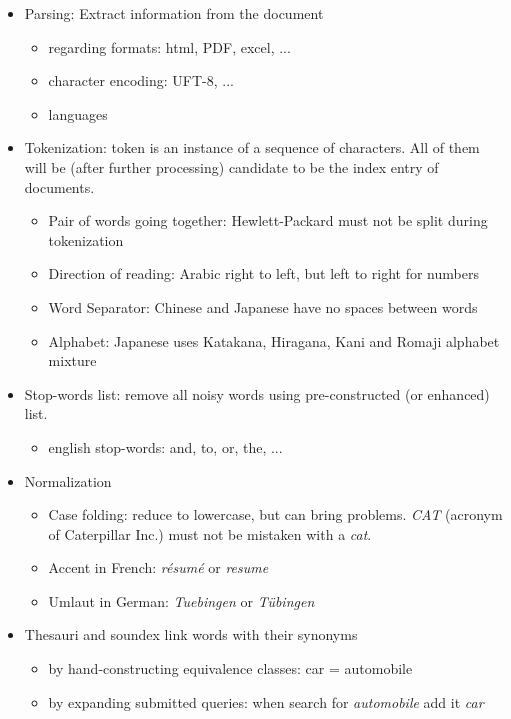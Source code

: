\begin{itemize}
	\item Parsing: Extract information from the document
	\begin{itemize}
		\item regarding formats: html, PDF, excel, ... 
		\item character encoding: UFT-8, ...
		\item languages
	\end{itemize}
	
	\item Tokenization: token is an instance of a sequence of characters. All of them will be (after further processing) candidate to be the index entry of documents.
	\begin{itemize}
		\item Pair of words going together: Hewlett-Packard must not be split during tokenization
		\item Direction of reading: Arabic right to left, but left to right for numbers
		\item Word Separator: Chinese and Japanese have no spaces between words
		\item Alphabet: Japanese uses Katakana, Hiragana, Kani and Romaji alphabet mixture
	\end{itemize}
	
	\item Stop-words list: remove all noisy words using pre-constructed (or enhanced) list.
	\begin{itemize}
		\item english stop-words: and, to, or, the, ...
	\end{itemize}
	
	\item Normalization
	\begin{itemize}
		\item Case folding: reduce to lowercase, but can bring problems. {\it CAT} (acronym of Caterpillar Inc.) must not be mistaken with a {\it cat}.
		\item Accent in French:  {\it r\'esum\'e} or  {\it resume} 
		\item Umlaut in German: {\it Tuebingen} or {\it T\"ubingen}
	\end{itemize}
	
	\item Thesauri and soundex link words with their synonyms 
	\begin{itemize}
		\item by hand-constructing equivalence classes: car = automobile
		\item by expanding submitted queries: when search for {\it automobile} add it {\it car}
	\end{itemize}
	

\end{itemize}
